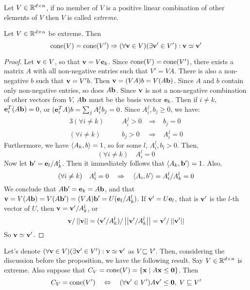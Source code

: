\begin{Def}[Extreme]
  Let $V \in \mathbb{R}^{d\times n}$, if no member of $V$ is a positive linear combination of other elements of $V$ then $V$ is called \textit{extreme}.
\end{Def}


\begin{Prop}{\label{prop:minrays}
  Let $V \in \mathbb{R}^{d\times n}$ be extreme.  Then
  \[ \operatorname{cone}(V) = \operatorname{cone}(V') \Rightarrow (\forall \mathbf{v} \in V)(\exists \mathbf{v}'\in V') 
                            : \mathbf{v} \simeq \mathbf{v}' \]
} \end{Prop}

\begin{proof}
Let $\mathbf{v} \in V$, so that $\mathbf{v} = V\mathbf{e}_k$.  Since $\operatorname{cone}(V) = \operatorname{cone}(V')$, there exists a matrix $A$ with all non-negative entries such that $V' = VA$.  There is also a non-negative $b$ such that $\mathbf{v} = V'b$.  Then $\mathbf{v} = (VA)b = V(A\mathbf{b})$.  Since $A$ and $b$ contain only non-negative entries, so does $A\mathbf{b}$.  Since $\mathbf{v}$ is not a non-negative combination of other vectors from $V$, $A\mathbf{b}$ must be the basis vector $\mathbf{e}_k$.  Then if $i \neq k$, $\mathbf{e}_i^T(A\mathbf{b}) = 0$, or $(\mathbf{e}_i^TA)b = \sum_j A_i^j b_j = 0$.  Since $A_i^j, b_j \geq 0$, we have:
\begin{alignat*}{3}
  (\forall i \neq k)&\quad&A_i^j > 0 \;&\Rightarrow&\; b_j = 0 \\
  (\forall i \neq k)&\quad&b_j > 0   \;&\Rightarrow&\; A_i^j = 0
\end{alignat*}
Furthermore, we have $\left\langle A_k, b \right\rangle = 1$, so for some $l$, $A_i^l,b_l > 0$.  Then, 
\[ (\forall i \neq k)\quad A_i^l = 0 \]
Now let $\mathbf{b}'=\mathbf{e}_l/A_k^l$.  Then it immediately follows that $\left\langle A_k, \mathbf{b}' \right\rangle = 1$.  Also,
\[ (\forall i \neq k)\quad A_i^l = 0 \quad \Rightarrow\quad \left\langle A_i, b' \right\rangle = A_i^l/A_k^l = 0\]
We conclude that $A\mathbf{b}' = \mathbf{e}_k = A\mathbf{b}$, and that $\mathbf{v} = V(A\mathbf{b}) = V(A\mathbf{b}') = (VA)\mathbf{b}' = U(\mathbf{e}_l/A_k^l)$.  If $\mathbf{v}' = U\mathbf{e}_l$, that is $\mathbf{v}'$ is the $l$-th vector of $U$, then $\mathbf{v} = \mathbf{v}'/A_k^l$, or 
\[ \mathbf{v}/\left|\left|\mathbf{v}\right|\right| = (\mathbf{v}'/A_k^l)/\left|\left|\mathbf{v}'/A_k^l\right|\right| = \mathbf{v}'/\left|\left|\mathbf{v}'\right|\right| \]
So $\mathbf{v} \simeq \mathbf{v}'$.
\end{proof}

Let's denote $(\forall \mathbf{v} \in V)(\exists \mathbf{v}'\in V') : \mathbf{v} \simeq \mathbf{v}'$ as $V \sqsubseteq V'$.  Then, considering the discussion before the proposition, we have the following result.  Say $V \in \mathbb{R}^{d\times n}$ is extreme.  Also suppose that $C_V = \operatorname{cone}(V) = \left\{\mathbf{x}\;|\; A\mathbf{x}\leq\mathbf{0}\right\}$.  Then
\[ C_V = \operatorname{cone}(V') \quad\Leftrightarrow\quad 
   (\forall \mathbf{v}'\in V')A\mathbf{v}'\leq\mathbf{0},\; V \sqsubseteq V' \]


